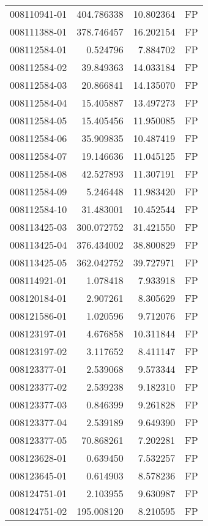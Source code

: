\begin{tabular}{lrrl}
008110941-01 &  404.786338 &    10.802364 &   FP \\
008111388-01 &  378.746457 &    16.202154 &   FP \\
008112584-01 &    0.524796 &     7.884702 &   FP \\
008112584-02 &   39.849363 &    14.033184 &   FP \\
008112584-03 &   20.866841 &    14.135070 &   FP \\
008112584-04 &   15.405887 &    13.497273 &   FP \\
008112584-05 &   15.405456 &    11.950085 &   FP \\
008112584-06 &   35.909835 &    10.487419 &   FP \\
008112584-07 &   19.146636 &    11.045125 &   FP \\
008112584-08 &   42.527893 &    11.307191 &   FP \\
008112584-09 &    5.246448 &    11.983420 &   FP \\
008112584-10 &   31.483001 &    10.452544 &   FP \\
008113425-03 &  300.072752 &    31.421550 &   FP \\
008113425-04 &  376.434002 &    38.800829 &   FP \\
008113425-05 &  362.042752 &    39.727971 &   FP \\
008114921-01 &    1.078418 &     7.933918 &   FP \\
008120184-01 &    2.907261 &     8.305629 &   FP \\
008121586-01 &    1.020596 &     9.712076 &   FP \\
008123197-01 &    4.676858 &    10.311844 &   FP \\
008123197-02 &    3.117652 &     8.411147 &   FP \\
008123377-01 &    2.539068 &     9.573344 &   FP \\
008123377-02 &    2.539238 &     9.182310 &   FP \\
008123377-03 &    0.846399 &     9.261828 &   FP \\
008123377-04 &    2.539189 &     9.649390 &   FP \\
008123377-05 &   70.868261 &     7.202281 &   FP \\
008123628-01 &    0.639450 &     7.532257 &   FP \\
008123645-01 &    0.614903 &     8.578236 &   FP \\
008124751-01 &    2.103955 &     9.630987 &   FP \\
008124751-02 &  195.008120 &     8.210595 &   FP \\

\end{tabular}
